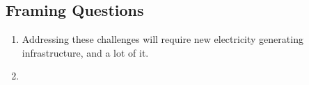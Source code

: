 \subsection{Framing Questions}
\begin{frame}
    \begin{enumerate}
        \item Addressing these challenges will require new electricity generating infrastructure, and a lot of it.
        \item  
    \end{enumerate}
\end{frame}